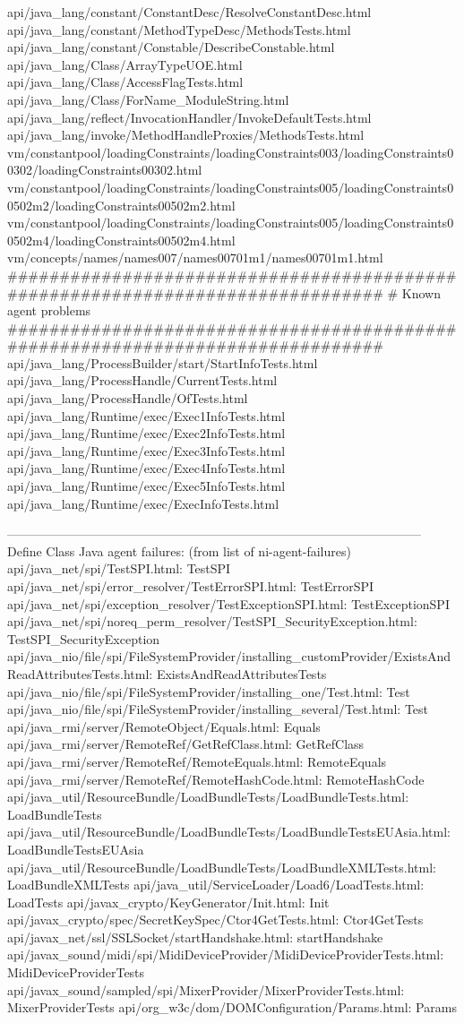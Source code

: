 api/java_lang/constant/ConstantDesc/ResolveConstantDesc.html
api/java_lang/constant/MethodTypeDesc/MethodsTests.html
api/java_lang/constant/Constable/DescribeConstable.html
api/java_lang/Class/ArrayTypeUOE.html
api/java_lang/Class/AccessFlagTests.html
api/java_lang/Class/ForName_ModuleString.html
api/java_lang/reflect/InvocationHandler/InvokeDefaultTests.html
api/java_lang/invoke/MethodHandleProxies/MethodsTests.html
vm/constantpool/loadingConstraints/loadingConstraints003/loadingConstraints00302/loadingConstraints00302.html
vm/constantpool/loadingConstraints/loadingConstraints005/loadingConstraints00502m2/loadingConstraints00502m2.html
vm/constantpool/loadingConstraints/loadingConstraints005/loadingConstraints00502m4/loadingConstraints00502m4.html
vm/concepts/names/names007/names00701m1/names00701m1.html
###############################################################################
# Known agent problems
###############################################################################
api/java_lang/ProcessBuilder/start/StartInfoTests.html
api/java_lang/ProcessHandle/CurrentTests.html
api/java_lang/ProcessHandle/OfTests.html
api/java_lang/Runtime/exec/Exec1InfoTests.html
api/java_lang/Runtime/exec/Exec2InfoTests.html
api/java_lang/Runtime/exec/Exec3InfoTests.html
api/java_lang/Runtime/exec/Exec4InfoTests.html
api/java_lang/Runtime/exec/Exec5InfoTests.html
api/java_lang/Runtime/exec/ExecInfoTests.html


---------------------------------------------------------------------------------------------------
Define Class Java agent failures: (from list of ni-agent-failures)
api/java_net/spi/TestSPI.html: TestSPI
api/java_net/spi/error_resolver/TestErrorSPI.html: TestErrorSPI
api/java_net/spi/exception_resolver/TestExceptionSPI.html: TestExceptionSPI
api/java_net/spi/noreq_perm_resolver/TestSPI_SecurityException.html: TestSPI_SecurityException
api/java_nio/file/spi/FileSystemProvider/installing_customProvider/ExistsAndReadAttributesTests.html: ExistsAndReadAttributesTests
api/java_nio/file/spi/FileSystemProvider/installing_one/Test.html: Test
api/java_nio/file/spi/FileSystemProvider/installing_several/Test.html: Test
api/java_rmi/server/RemoteObject/Equals.html: Equals
api/java_rmi/server/RemoteRef/GetRefClass.html: GetRefClass
api/java_rmi/server/RemoteRef/RemoteEquals.html: RemoteEquals
api/java_rmi/server/RemoteRef/RemoteHashCode.html: RemoteHashCode
api/java_util/ResourceBundle/LoadBundleTests/LoadBundleTests.html: LoadBundleTests
api/java_util/ResourceBundle/LoadBundleTests/LoadBundleTestsEUAsia.html: LoadBundleTestsEUAsia
api/java_util/ResourceBundle/LoadBundleTests/LoadBundleXMLTests.html: LoadBundleXMLTests
api/java_util/ServiceLoader/Load6/LoadTests.html: LoadTests
api/javax_crypto/KeyGenerator/Init.html: Init
api/javax_crypto/spec/SecretKeySpec/Ctor4GetTests.html: Ctor4GetTests
api/javax_net/ssl/SSLSocket/startHandshake.html: startHandshake
api/javax_sound/midi/spi/MidiDeviceProvider/MidiDeviceProviderTests.html: MidiDeviceProviderTests
api/javax_sound/sampled/spi/MixerProvider/MixerProviderTests.html: MixerProviderTests
api/org_w3c/dom/DOMConfiguration/Params.html: Params 

